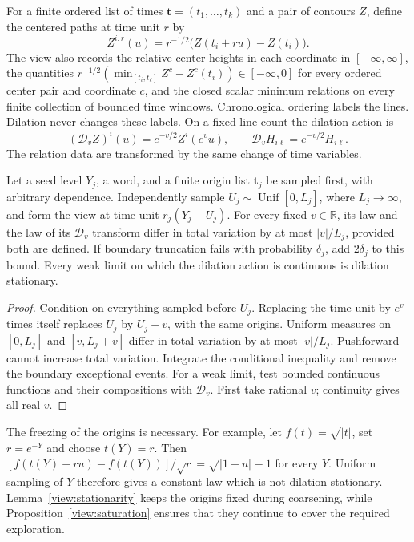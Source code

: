 For a finite ordered list of times $\mathbf t=(t_1,\ldots,t_k)$ and a pair of
contours $Z$, define the centered paths at time unit $r$ by
\[
 Z^{i,r}(u)=r^{-1/2}\bigl(Z(t_i+ru)-Z(t_i)\bigr).
\]
The view also records the relative center heights in each coordinate in
$[-\infty,\infty]$, the quantities
$r^{-1/2}(\min_{[t_i,t_\ell]}Z^c-Z^c(t_i))\in[-\infty,0]$ for every
ordered center pair and coordinate $c$, and the closed scalar minimum relations on every finite
collection of bounded time windows.  Chronological ordering labels the
lines.  Dilation never changes these labels.  On a fixed line count the
dilation action is
\[
 (\mathcal D_v Z)^i(u)=e^{-v/2}Z^i(e^v u),\qquad
 \mathcal D_v H_{i\ell}=e^{-v/2}H_{i\ell}.
\]
The relation data are transformed by the same change of time variables.

\begin{lemma}\label{view:stationarity}
Let a seed level $Y_j$, a word, and a finite origin list $\mathbf t_j$ be
sampled first, with arbitrary dependence.  Independently sample
$U_j\sim\operatorname{Unif}[0,L_j]$, where $L_j\to\infty$, and form the view
at time unit $r_j(Y_j-U_j)$.  For every fixed $v\in\mathbb R$, its law and
the law of its $\mathcal D_v$ transform differ in total variation by at
most $|v|/L_j$, provided both are defined.  If boundary truncation fails with
probability $\delta_j$, add $2\delta_j$ to this bound.  Every weak limit on
which the dilation action is continuous is dilation stationary.
\end{lemma}

\begin{proof}
Condition on everything sampled before $U_j$.  Replacing the time unit by
$e^v$ times itself replaces $U_j$ by $U_j+v$, with the same origins.
Uniform measures on $[0,L_j]$ and $[v,L_j+v]$ differ in total variation by
at most $|v|/L_j$.  Pushforward cannot increase total variation.  Integrate
the conditional inequality and remove the boundary exceptional events.
For a weak limit, test bounded continuous functions and their compositions
with $\mathcal D_v$.  First take rational $v$; continuity gives all real $v$.
\end{proof}

The freezing of the origins is necessary.  For example, let
$f(t)=\sqrt{|t|}$, set $r=e^{-Y}$ and choose $t(Y)=r$.  Then
$[f(t(Y)+ru)-f(t(Y))]/\sqrt r=\sqrt{|1+u|}-1$ for every $Y$.
Uniform sampling of $Y$ therefore gives a constant law which is not dilation
stationary.  Lemma~\ref{view:stationarity} keeps the origins fixed during
coarsening, while Proposition~\ref{view:saturation} ensures that they
continue to cover the required exploration.


